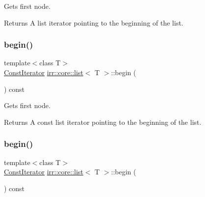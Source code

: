 Gets first node. 

\begin{DoxyReturn}{Returns}
A list iterator pointing to the beginning of the list. 
\end{DoxyReturn}
\mbox{\label{classirr_1_1core_1_1list_a9f7cba97077273eaaac4691c49cc35c1}} 
\subsubsection{\texorpdfstring{begin()}{begin()}\hspace{0.1cm}{\footnotesize\ttfamily [3/4]}}
{\footnotesize\ttfamily template$<$class T$>$ \\
\hyperlink{classirr_1_1core_1_1list_1_1ConstIterator}{Const\+Iterator} \hyperlink{classirr_1_1core_1_1list}{irr\+::core\+::list}$<$ T $>$\+::begin (\begin{DoxyParamCaption}{ }\end{DoxyParamCaption}) const\hspace{0.3cm}{\ttfamily [inline]}}



Gets first node. 

\begin{DoxyReturn}{Returns}
A const list iterator pointing to the beginning of the list. 
\end{DoxyReturn}
\mbox{\label{classirr_1_1core_1_1list_a9f7cba97077273eaaac4691c49cc35c1}} 
\subsubsection{\texorpdfstring{begin()}{begin()}\hspace{0.1cm}{\footnotesize\ttfamily [4/4]}}
{\footnotesize\ttfamily template$<$class T$>$ \\
\hyperlink{classirr_1_1core_1_1list_1_1ConstIterator}{Const\+Iterator} \hyperlink{classirr_1_1core_1_1list}{irr\+::core\+::list}$<$ T $>$\+::begin (\begin{DoxyParamCaption}{ }\end{DoxyParamCaption}) const\hspace{0.3cm}{\ttfamily [inline]}}



